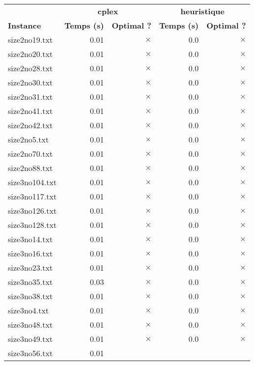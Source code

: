 \documentclass{article}
\begin{document}
\newpage
\begin{center}
\renewcommand{\arraystretch}{1.4} 
 \begin{tabular}{lrrrr}
	\hline
 & \multicolumn{2}{c}{\textbf{cplex}} & \multicolumn{2}{c}{\textbf{heuristique}}\\
\textbf{Instance}  & \textbf{Temps (s)} & \textbf{Optimal ?}  & \textbf{Temps (s)} & \textbf{Optimal ?} \\\hline

size2no19.txt & 0.01 & 
$\times$
 & 0.0 & 
$\times$
\\
size2no20.txt & 0.01 & 
$\times$
 & 0.0 & 
$\times$
\\
size2no28.txt & 0.01 & 
$\times$
 & 0.0 & 
$\times$
\\
size2no30.txt & 0.01 & 
$\times$
 & 0.0 & 
$\times$
\\
size2no31.txt & 0.01 & 
$\times$
 & 0.0 & 
$\times$
\\
size2no41.txt & 0.01 & 
$\times$
 & 0.0 & 
$\times$
\\
size2no42.txt & 0.01 & 
$\times$
 & 0.0 & 
$\times$
\\
size2no5.txt & 0.01 & 
$\times$
 & 0.0 & 
$\times$
\\
size2no70.txt & 0.01 & 
$\times$
 & 0.0 & 
$\times$
\\
size2no88.txt & 0.01 & 
$\times$
 & 0.0 & 
$\times$
\\
size3no104.txt & 0.01 & 
$\times$
 & 0.0 & 
$\times$
\\
size3no117.txt & 0.01 & 
$\times$
 & 0.0 & 
$\times$
\\
size3no126.txt & 0.01 & 
$\times$
 & 0.0 & 
$\times$
\\
size3no128.txt & 0.01 & 
$\times$
 & 0.0 & 
$\times$
\\
size3no14.txt & 0.01 & 
$\times$
 & 0.0 & 
$\times$
\\
size3no16.txt & 0.01 & 
$\times$
 & 0.0 & 
$\times$
\\
size3no23.txt & 0.01 & 
$\times$
 & 0.0 & 
$\times$
\\
size3no35.txt & 0.03 & 
$\times$
 & 0.0 & 
$\times$
\\
size3no38.txt & 0.01 & 
$\times$
 & 0.0 & 
$\times$
\\
size3no4.txt & 0.01 & 
$\times$
 & 0.0 & 
$\times$
\\
size3no48.txt & 0.01 & 
$\times$
 & 0.0 & 
$\times$
\\
size3no49.txt & 0.01 & 
$\times$
 & 0.0 & 
$\times$
\\
size3no56.txt & 0.01 & 

\end{tabular}
\end{center}
\end{document}
